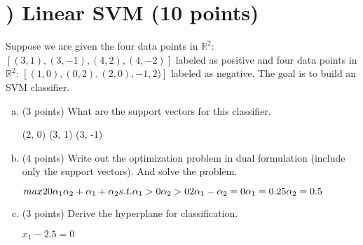 \documentclass[11pt]{article}
\newcounter{QuestionCounter}
\begin{document}
\section*{) Linear SVM (10 points)} 
Suppose we are given the four data points in $\mathbb{R}^2$: $\left[ (3,1), (3,-1), (4,2), (4,-2)\right ]$ labeled as positive and four data points in $\mathbb{R}^2$: $\left[ (1,0), (0,2), (2,0), -1,2)\right ]$ labeled as negative. The goal is to build an SVM classifier. 
\begin{enumerate}[(a)]
\item (3 points) What are the support vectors for this classifier.

\begin{answertext}{8cm}{}
    (2, 0) (3, 1) (3, -1)
\end{answertext} 
\item (4 points) Write out the optimization problem in dual formulation (include only the support vectors). And solve the problem.

\begin{answertext}{10cm}{}
    $max 20\alpha_1\alpha_2 + \alpha_1 + \alpha_2 \\
    s.t. \alpha_1 > 0\\
         \alpha_2 > 0\\
         2\alpha_1 - \alpha_2 = 0
         \alpha_1=0.25
         \alpha_2=0.5
    $
\end{answertext} 
\item (3 points) Derive the hyperplane for classification. 

\begin{answertext}{8cm}{}
    $x_1 - 2.5 = 0$
\end{answertext} 
\end{enumerate}
\end{document}
